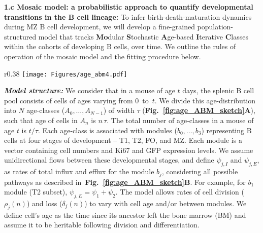 \documentclass[11pt]{article}
\newcommand\ie{$\textit{i.e.}$}
\newcommand{\blue}[1]{{\color{blue}{#1}}}
\begin{document}
\textbf{{1.c Mosaic model: a probabilistic approach to quantify developmental transitions in the B cell lineage:}}
To infer birth-death-maturation dynamics during MZ B cell development, we will develop a fine-grained population-structured model that tracks \textbf{Mo}dular \textbf{S}tochastic \textbf{A}ge-based \textbf{I}terative \textbf{C}lasses within the cohorts of developing B cells, over time.
We outline the rules of operation of the mosaic model and the fitting procedure below.

\begin{wrapfigure}{r}{0.38\textwidth}
\centering
\texttt{[image: Figures/age\_abm4.pdf]}
\vspace*{-7mm}
\caption{
\textbf{(A)} Schematics of the mosaic model. %
\textbf{(B)} Candidate pathways of B cell development.
}
\vspace*{-5mm}
\label{fig:age_ABM_sketch}
\end{wrapfigure}

\textbf{\textit{Model structure:}}
We consider that in a mouse of age $t$ days, the splenic B cell pool consists of cells of ages varying from $0$~to~$t$.
We divide this age-distribution into $N$ age-classes ($A_{0} ,\ldots, A_{N-1}$)  of width $\tau$ (\textbf{Fig.~\ref{fig:age_ABM_sketch}A}), such that age of cells in $A_{n}$ is $n \, \tau$. %
The total number of age-classes in a mouse of age $t$ is $t/\tau$.
Each age-class is associated with modules ($b_{0} ,\ldots, b_{3}$) representing B cells at four stages of development -- T1, T2, FO, and MZ. Each module is a vector containing cell numbers and Ki67 and GFP expression levels. %
We assume unidirectional flows between these developmental stages, and define $\psi_{j, I}$ and $\psi_{j, E}$, as rates of total influx and efflux for the module $b_j$, considering all possible pathways as described in~\textbf{Fig.~\ref{fig:age_ABM_sketch}B}.
For example, for $b_1$ module (T2 subset), $\psi_{j,E} = \psi_1 + \psi_2$.
The model allows rates of cell division ($\rho_{j}(n)$) and loss ($\delta_{j}(n)$) to vary with cell age and/or between modules. 
We define cell's age as the time since its ancestor left the bone marrow (BM) and assume it to be heritable following division and differentiation.
\end{document}
